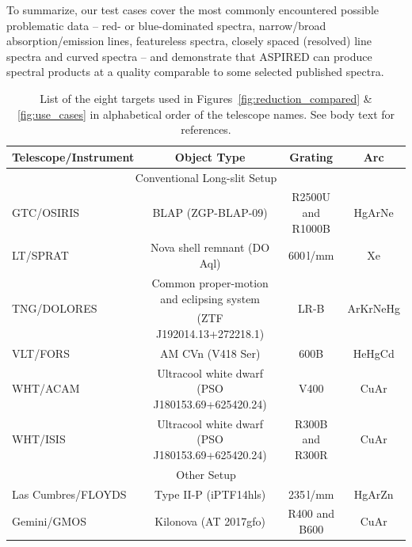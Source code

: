 \documentclass[linenumbers, twocolumn]{aastex631}
\begin{document}
To summarize, our test cases cover the most commonly encountered possible
problematic data -- red- or blue-dominated spectra, narrow/broad
absorption/emission lines, featureless spectra, closely spaced (resolved)
line spectra and curved spectra -- and demonstrate that \textsc{ASPIRED} can
produce spectral products at a quality comparable to some
selected published spectra.

\begin{table}
    \begin{tabular}{l|c|c|c}\hline
        Telescope/Instrument & Object Type                                 & Grating             & Arc \\\hline\hline
        \multicolumn{4}{c}{Conventional Long-slit Setup}\\\hline

        GTC/OSIRIS           & BLAP (ZGP-BLAP-09)                          & R2500U and R1000B    & HgArNe \\
        LT/SPRAT      & Nova shell remnant (DO Aql)                 & 600\,l/mm           & Xe \\
        \multirow{2}{*}{TNG/DOLORES}          & Common proper-motion and eclipsing system     & \multirow{2}{*}{LR-B}                & \multirow{2}{*}{ArKrNeHg} \\
                             & (ZTF J192014.13+272218.1)     &           &  \\
        VLT/FORS             & AM CVn (V418 Ser)                           & 600B                & HeHgCd \\
        WHT/ACAM             & Ultracool white dwarf (PSO J180153.69+625420.24)       & V400                & CuAr \\
        WHT/ISIS             & Ultracool white dwarf (PSO J180153.69+625420.24)       & R300B and R300R      & CuAr \\\hline
        \multicolumn{4}{c}{Other Setup}\\\hline
        Las Cumbres/FLOYDS           & Type II-P (iPTF14hls)                       & 235\,l/mm           & HgArZn \\
        Gemini/GMOS          & Kilonova (AT 2017gfo)                       & R400 and B600        & CuAr \\\hline
\end{tabular}
    \caption{List of the eight targets used in Figures~\ref{fig:reduction_compared} \& \ref{fig:use_cases} in alphabetical order of the telescope names. See body text for references.}
    \label{tab:summary}
\end{table}
\end{document}
